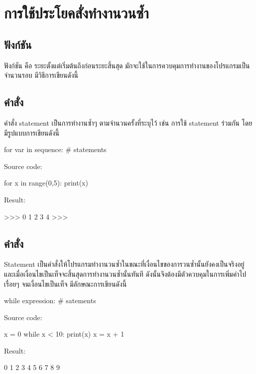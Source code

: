 \chapter{การใช้ประโยคสั่งทำงานวนซ้ำ}
\section{ฟังก์ชัน  }

ฟังก์ชัน   คือ ระยะตั้งแต่เริ่มต้นถึงก่อนระยะสิ้นสุด มักจะใช้ในการควบคุมการทำงานของโปรแกรมเป็นจำนวนรอบ มีวิธีการเขียนดังนี้  

\section{คำสั่ง  }

คำสั่ง   statement เป็นการทำงานซ้ำๆ ตามจำนวนครั้งที่ระบุไว้ เช่น การใช้   statement ร่วมกัน   โดยมีรูปแบบการเขียนดังนี้

\begin{pycode}
for var in sequence:
    # statements
\end{pycode}

Source code:
\begin{pycode}
for x in range(0,5): print(x)
\end{pycode}

Result:
\begin{pycode}
>>>
0
1
2
3
4
>>>
\end{pycode}

\section{คำสั่ง  }

  Statement เป็นคำสั่งให้โปรแกรมทำงานวนซ้ำในขณะที่เงื่อนไขของการวนซ้ำนั้นยังคงเป็นจริงอยู่ และเมื่อเงื่อนไขเป็นเท็จจะสิ้นสุดการทำงานวนซ้ำนั้นทันที ดังนั้นจึงต้องมีตัวควบคุมในการเพิ่มค่าไปเรื่อยๆ จนเงื่อนไขเป็นเท็จ มีลักษณะการเขียนดังนี้

\begin{pycode}
while expression:
    # satements
\end{pycode}

Source code:
\begin{pycode}
x = 0
while x < 10:
    print(x)
    x = x + 1
\end{pycode}

Result:
\begin{pycode}
0
1
2
3
4
5
6
7
8
9
\end{pycode}

